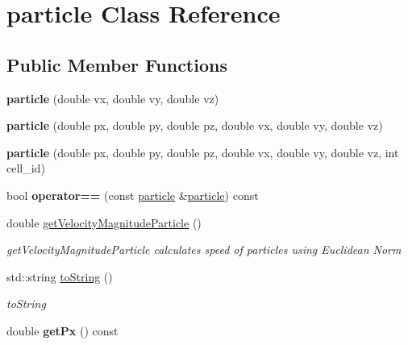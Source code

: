 \hypertarget{classparticle}{}\section{particle Class Reference}
\label{classparticle}
\subsection*{Public Member Functions}
\begin{DoxyCompactItemize}
\item 
\mbox{\label{classparticle_aa5adef29810de80b814f3d9938b4c9aa}} 
{\bfseries particle} (double vx, double vy, double vz)
\item 
\mbox{\label{classparticle_a9b729c767ff1da43dc1fe6bba898a710}} 
{\bfseries particle} (double px, double py, double pz, double vx, double vy, double vz)
\item 
\mbox{\label{classparticle_a19d2d4e8dc60c0a014415a601671bd07}} 
{\bfseries particle} (double px, double py, double pz, double vx, double vy, double vz, int cell\+\_\+id)
\item 
\mbox{\label{classparticle_ab743d68f73ebb2ae9fa18c05cf1a5bf3}} 
bool {\bfseries operator==} (const \hyperlink{classparticle}{particle} \&\hyperlink{classparticle}{particle}) const
\item 
double \hyperlink{classparticle_a4746319805ea7d18c4a3eac998b02043}{get\+Velocity\+Magnitude\+Particle} ()
\begin{DoxyCompactList}\small\item\em get\+Velocity\+Magnitude\+Particle calculates speed of particles using Euclidean Norm \end{DoxyCompactList}\item 
std\+::string \hyperlink{classparticle_a48098f62cff10f99c3676ac12a168f02}{to\+String} ()
\begin{DoxyCompactList}\small\item\em to\+String \end{DoxyCompactList}\item 
\mbox{\label{classparticle_a932b36c4cdf7439e02f06ca764f9c286}} 
double {\bfseries get\+Px} () const
\item 
\mbox{\label{classparticle_a6d1bbc85ccbe0d7656d004419f65ef3f}} 

\end{DoxyCompactItemize}
